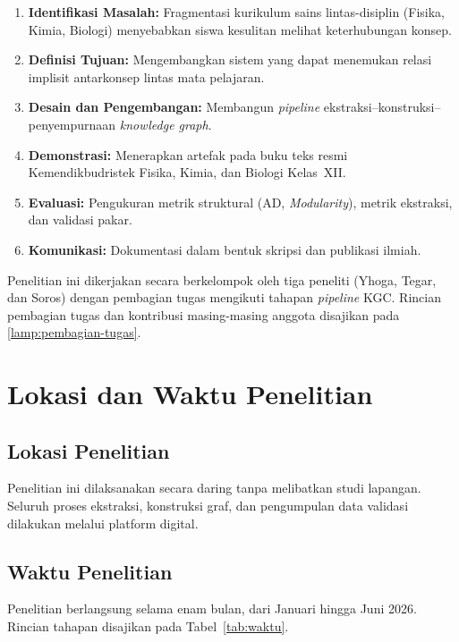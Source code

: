 \documentclass[../../thesis]{subfiles}
\begin{document}
\begin{enumerate}
  \item \textbf{Identifikasi Masalah:} Fragmentasi kurikulum sains
        lintas-disiplin (Fisika, Kimia, Biologi) menyebabkan siswa
        kesulitan melihat keterhubungan konsep.
  \item \textbf{Definisi Tujuan:} Mengembangkan sistem yang dapat
        menemukan relasi implisit antarkonsep lintas mata pelajaran.
  \item \textbf{Desain dan Pengembangan:} Membangun \textit{pipeline}
        ekstraksi--konstruksi--penyempurnaan \textit{knowledge graph}.
  \item \textbf{Demonstrasi:} Menerapkan artefak pada buku teks resmi
        Kemendikbudristek Fisika, Kimia, dan Biologi Kelas~XII.
  \item \textbf{Evaluasi:} Pengukuran metrik struktural (AD,
        \textit{Modularity}), metrik ekstraksi, dan validasi pakar.
  \item \textbf{Komunikasi:} Dokumentasi dalam bentuk skripsi dan
        publikasi ilmiah.
\end{enumerate}

Penelitian ini dikerjakan secara berkelompok oleh tiga peneliti (Yhoga,
Tegar, dan Soros) dengan pembagian tugas mengikuti tahapan
\textit{pipeline} KGC. Rincian pembagian tugas dan kontribusi
masing-masing anggota disajikan pada \ref{lamp:pembagian-tugas}.

\section{Lokasi dan Waktu Penelitian}

\subsection{Lokasi Penelitian}

Penelitian ini dilaksanakan secara daring tanpa melibatkan studi
lapangan. Seluruh proses ekstraksi, konstruksi graf, dan pengumpulan
data validasi dilakukan melalui platform digital.

\subsection{Waktu Penelitian}

Penelitian berlangsung selama enam bulan, dari Januari hingga Juni 2026.
Rincian tahapan disajikan pada Tabel~\ref{tab:waktu}.
\end{document}

